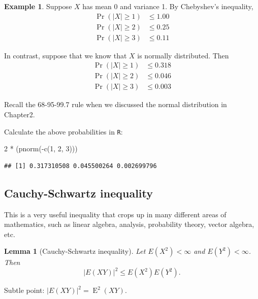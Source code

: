\documentclass[
]{book}
\newenvironment{Shaded}{\begin{snugshade}}{\end{snugshade}}
\newcommand{\DecValTok}[1]{\textcolor[rgb]{0.00,0.00,0.81}{#1}}
\newcommand{\FunctionTok}[1]{\textcolor[rgb]{0.00,0.00,0.00}{#1}}
\newcommand{\NormalTok}[1]{#1}
\newcommand{\SpecialCharTok}[1]{\textcolor[rgb]{0.00,0.00,0.00}{#1}}
\DeclareMathOperator{\E}{E}
\newtheorem{lemma}{Lemma}[chapter]
\theoremstyle{definition}
\theoremstyle{definition}
\newtheorem{example}{Example}[chapter]
\theoremstyle{definition}
\theoremstyle{definition}
\theoremstyle{remark}
\begin{document}
\begin{example}
Suppose \(X\) has mean 0 and variance 1. By Chebyshev's inequality,
\[\begin{aligned}
    \Pr(|X| \geq 1) &\leq 1.00 \\
    \Pr(|X| \geq 2) &\leq 0.25 \\
    \Pr(|X| \geq 3) &\leq 0.11 
  \end{aligned}\]

In contrast, suppose that we know that \(X\) is normally
distributed. Then \[\begin{aligned}
    \Pr(|X| \geq 1) &\leq 0.318 \\
    \Pr(|X| \geq 2) &\leq 0.046 \\
    \Pr(|X| \geq 3) &\leq 0.003 
  \end{aligned}\]

Recall the 68-95-99.7 rule when we discussed the normal distribution in Chapter2.
\end{example}

Calculate the above probabilities in \texttt{R}:

\begin{Shaded}
\begin{Highlighting}[]
\DecValTok{2} \SpecialCharTok{*}\NormalTok{ (}\FunctionTok{pnorm}\NormalTok{(}\SpecialCharTok{{-}}\FunctionTok{c}\NormalTok{(}\DecValTok{1}\NormalTok{, }\DecValTok{2}\NormalTok{, }\DecValTok{3}\NormalTok{)))}
\end{Highlighting}
\end{Shaded}

\begin{verbatim}
## [1] 0.317310508 0.045500264 0.002699796
\end{verbatim}

\hypertarget{cauchy-schwartz-inequality}{%
\subsection{Cauchy-Schwartz inequality}\label{cauchy-schwartz-inequality}}

This is a very useful inequality that crops up in many different areas of mathematics, such as linear algebra, analysis, probability theory, vector algebra, etc.

\begin{lemma}[Cauchy-Schwartz inequality]
Let \(E(X^2)<\infty\) and \(E(Y^2)<\infty\). Then
\[|E(XY)|^2 \leq E(X^2)E(Y^2).\]
\end{lemma}

Subtle point: \(|E(XY)|^2 = \E^2(XY)\).
\end{document}
